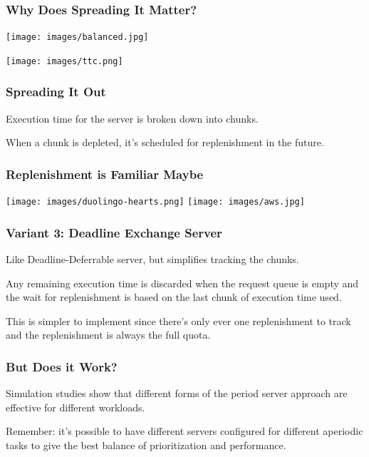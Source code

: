 \begin{frame}
\frametitle{Why Does Spreading It Matter?}

\begin{center}
	\texttt{[image: images/balanced.jpg]}
\end{center}

\begin{center}
	\texttt{[image: images/ttc.png]}
\end{center}

\end{frame}

\begin{frame}
\frametitle{Spreading It Out}

Execution time for the server is broken down into chunks.

When a chunk is depleted, it's scheduled for replenishment in the future.

\end{frame}

\begin{frame}
\frametitle{Replenishment is Familiar Maybe}

\begin{center}
	\texttt{[image: images/duolingo-hearts.png]}
	\texttt{[image: images/aws.jpg]}
\end{center}

\end{frame}

\begin{frame}
\frametitle{Variant 3: Deadline Exchange Server}
Like Deadline-Deferrable server, but simplifies tracking the chunks.

Any remaining execution time is discarded when the request queue is empty and the wait for replenishment is based on the last chunk of execution time used.

This is simpler to implement since there's only ever one replenishment to track and the replenishment is always the full quota. 

\end{frame}

\begin{frame}
\frametitle{But Does it Work?}

Simulation studies show that different forms of the period server approach are effective for different workloads.

Remember: it's possible to have different servers configured for different aperiodic tasks to give the best balance of prioritization and performance.

\end{frame}

